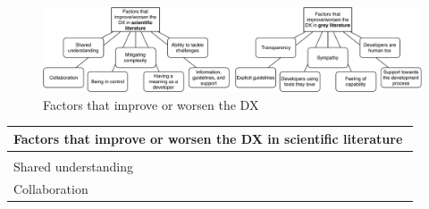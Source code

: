 \documentclass[english, 12pt, a4paper, sci, utf8, a-1b, online]{aaltothesis}
\begin{document}
\begin{figure}[h]
  \begin{center}
    \includegraphics[width=\textwidth]{factors-that-improve-worsen-the-dx.pdf}
  \end{center}
  \captionsetup{width=0.6\textwidth}
  \caption{Factors that improve or worsen the DX}
  \label{figure:factors-that-improve-worsen-the-dx}
\end{figure}

\renewcommand{\arraystretch}{1.5}
\begin{center}
  \begin{longtable}{p{0.3\linewidth}p{0.6\linewidth}}
    \multicolumn{2}{l}{\textbf{Factors that improve or worsen the DX in scientific literature}}                                                                                                                                                                                                                                                                                                                                         \\
    \hline                                                                                                                                                                                                                                                                                                                                                                 \\
    Shared understanding                    & \textcite{how-developers-experience-team-performance} \newline \textcite{paw} \newline \textcite{api-designers} \newline \textcite{fontao2016mseco}                                                                                                                                                                          \\
    Collaboration                           & \textcite{design-framework-enhancing} \newline \textcite{entering-an-ecosystem} \newline \textcite{exploring-peopleware-in-cd} \newline \textcite{romano2018effect} \newline \textcite{ollis2019helping} \newline \textcite{oran2017set} \newline \textcite{on-the-unhappiness} \newline \textcite{open-service-innovation} \\

\end{longtable}
\end{center}
\end{document}
